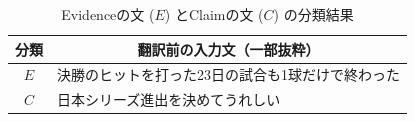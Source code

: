 \documentclass[a4paper, twocolumn, 10pt]{jarticle}
\begin{document}
\begin{table}[h]
  \caption{Evidenceの文 ($E$) とClaimの文 ($C$) の分類結果}
  \label{classify_result}
  \centering
  \begin{tabular}{cp{6cm}}
    \hline
    分類 & \multicolumn{1}{c}{翻訳前の入力文（一部抜粋）}  \\
    \hline \hline
    $E$  & 決勝のヒットを打った23日の試合も1球だけで終わった \\
    $C$  & 日本シリーズ進出を決めてうれしい \\
    \hline
  \end{tabular}
\end{table}



\end{document}
